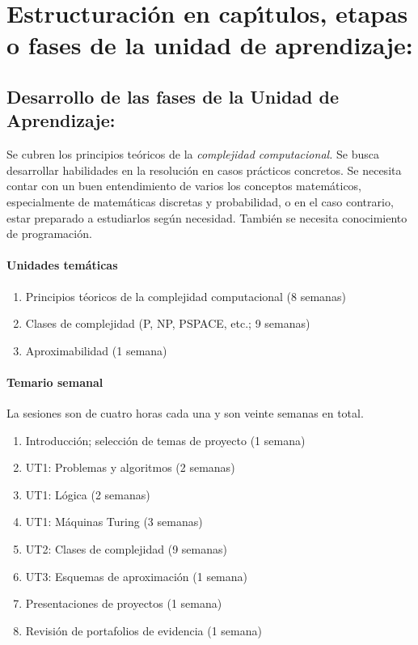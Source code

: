 \section{Estructuraci\'{o}n en cap\'{\i}tulos, etapas o fases de la unidad de
  aprendizaje:}
\subsection{Desarrollo de las fases de la Unidad de Aprendizaje:}

\quad

Se cubren los principios te\'{o}ricos de la {\em complejidad
  computacional.} Se busca desarrollar habilidades en la
resoluci\'{o}n en casos pr\'{a}cticos concretos. Se necesita contar
con un buen entendimiento de varios los conceptos matem\'{a}ticos,
especialmente de matem\'{a}ticas discretas y probabilidad, o en el
caso contrario, estar preparado a estudiarlos seg\'{u}n
necesidad. Tambi\'{e}n se necesita conocimiento de programaci\'{o}n.

\paragraph{Unidades tem\'{a}ticas}

\begin{enumerate}[itemsep=-2pt]
\item Principios t\'{e}oricos de la complejidad computacional (8 semanas)
\item Clases de complejidad (P, NP, PSPACE, etc.; 9 semanas)
\item Aproximabilidad (1 semana)
\end{enumerate}

\paragraph{Temario semanal}

\quad

La sesiones son de cuatro horas cada una y son veinte semanas en
total.

\begin{enumerate}[itemsep=-3pt]
\item{Introducci\'{o}n; selecci\'{o}n de temas de proyecto (1 semana)}
\item{UT1: Problemas y algoritmos (2 semanas)}
\item{UT1: L\'{o}gica (2 semanas)}
\item{UT1: M\'{a}quinas Turing (3 semanas)}
\item{UT2: Clases de complejidad (9 semanas)}
\item{UT3: Esquemas de aproximaci\'{o}n (1 semana)}
\item{Presentaciones de proyectos (1 semana)}
\item{Revisi\'{o}n de portafolios de evidencia (1 semana)}
\end{enumerate}

